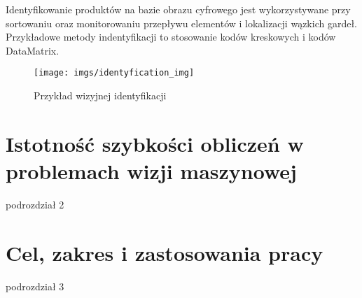 \documentclass[document.tex]{subfiles}
\begin{document}
	\indent Identyfikowanie produktów na bazie obrazu cyfrowego jest wykorzystywane przy sortowaniu
	oraz monitorowaniu przepływu elementów i lokalizacji wązkich gardeł.
	Przykładowe metody indentyfikacji to stosowanie kodów kreskowych i kodów DataMatrix.\cite{Machine_Vision_Intro}
	
	\begin{figure}[h]
	\texttt{[image: imgs/identyfication\_img]}
	\caption{Przykład wizyjnej identyfikacji\cite{Machine_Vision_Intro}}
	\label{fig:identyfikacja}
	\end{figure}
	
\section{Istotność szybkości obliczeń w problemach wizji maszynowej}
podrozdział 2
\section{Cel, zakres i zastosowania pracy}
podrozdział 3
\end{document}
